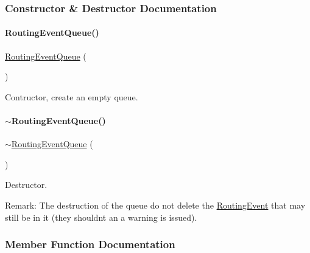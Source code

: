 \subsubsection{Constructor \& Destructor Documentation}
\mbox{\label{classKite_1_1RoutingEventQueue_a67dd3abe4f9f4f32e91dfaa9573976ca}} 
\paragraph{\texorpdfstring{Routing\+Event\+Queue()}{RoutingEventQueue()}}
{\footnotesize\ttfamily \mbox{\hyperlink{classKite_1_1RoutingEventQueue}{Routing\+Event\+Queue}} (\begin{DoxyParamCaption}{ }\end{DoxyParamCaption})}

Contructor, create an empty queue. \mbox{\label{classKite_1_1RoutingEventQueue_a28ed9894863ae1029f16744a86d4bfab}} 
\paragraph{\texorpdfstring{$\sim$\+Routing\+Event\+Queue()}{~RoutingEventQueue()}}
{\footnotesize\ttfamily $\sim$\mbox{\hyperlink{classKite_1_1RoutingEventQueue}{Routing\+Event\+Queue}} (\begin{DoxyParamCaption}{ }\end{DoxyParamCaption})}

Destructor.

\begin{DoxyParagraph}{Remark\+: The destruction of the queue do not delete the}
\mbox{\hyperlink{classKite_1_1RoutingEvent}{Routing\+Event}} that may still be in it (they shouldn\textquotesingle{}t an a warning is issued). 
\end{DoxyParagraph}


\subsubsection{Member Function Documentation}
\mbox{\label{classKite_1_1RoutingEventQueue_a644718bb2fb240de962dc3c9a1fdf0dc}} 
